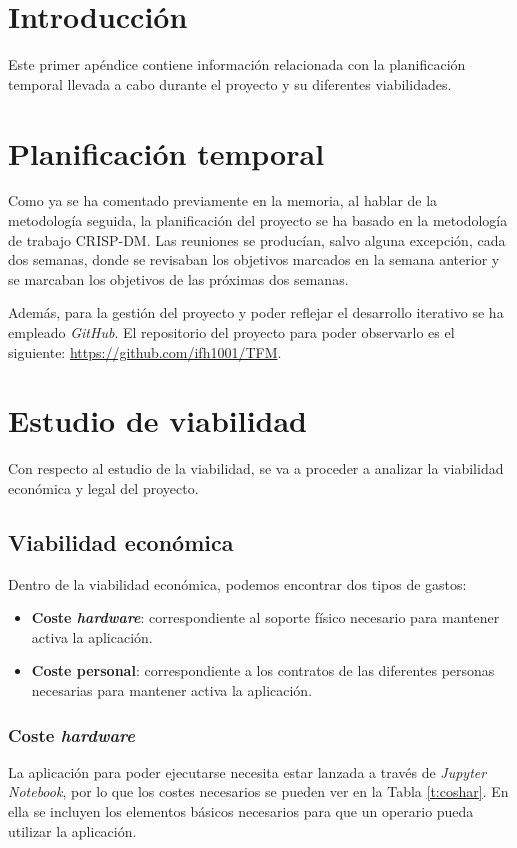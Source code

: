 
\section{Introducción}
Este primer apéndice contiene información relacionada con la planificación temporal llevada a cabo durante el proyecto y su diferentes viabilidades.

\section{Planificación temporal}
Como ya se ha comentado previamente en la memoria, al hablar de la metodología seguida, la planificación del proyecto se ha basado en la metodología de trabajo CRISP-DM. Las reuniones se producían, salvo alguna excepción, cada dos semanas, donde se revisaban los objetivos marcados en la semana anterior y se marcaban los objetivos de las próximas dos semanas.

Además, para la gestión del proyecto y poder reflejar el desarrollo iterativo se ha empleado \emph{GitHub}. El repositorio del proyecto para poder observarlo es el siguiente: \url{https://github.com/ifh1001/TFM}.

\section{Estudio de viabilidad}
Con respecto al estudio de la viabilidad, se va a proceder a analizar la viabilidad económica y legal del proyecto.

\subsection{Viabilidad económica}
Dentro de la viabilidad económica, podemos encontrar dos tipos de gastos:
\begin{itemize}
    \item \textbf{Coste \emph{hardware}}: correspondiente al soporte físico necesario para mantener activa la aplicación.
    \item \textbf{Coste personal}: correspondiente a los contratos de las diferentes personas necesarias para mantener activa la aplicación. 
\end{itemize}
\subsubsection{Coste \emph{hardware}}
La aplicación para poder ejecutarse necesita estar lanzada a través de \emph{Jupyter Notebook}, por lo que los costes necesarios se pueden ver en la Tabla \ref{t:coshar}. En ella se incluyen los elementos básicos necesarios para que un operario pueda utilizar la aplicación.

